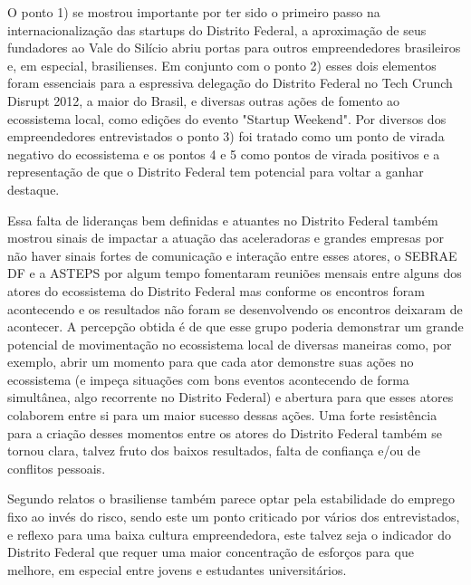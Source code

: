 O ponto 1) se mostrou importante por ter sido o primeiro passo na internacionalização das startups do Distrito Federal, a aproximação de seus fundadores ao Vale do Silício abriu portas para outros empreendedores brasileiros e, em especial, brasilienses. Em conjunto com o ponto 2) esses dois elementos foram essenciais para a espressiva delegação do Distrito Federal no Tech Crunch Disrupt 2012, a maior do Brasil, e diversas outras ações de fomento ao ecossistema local, como edições do evento "Startup Weekend". Por diversos dos empreendedores entrevistados o ponto 3) foi tratado como um ponto de virada negativo do ecossistema e os pontos 4 e 5 como pontos de virada positivos e a representação de que o Distrito Federal tem potencial para voltar a ganhar destaque. 

Essa falta de lideranças bem definidas e atuantes no Distrito Federal também mostrou sinais de impactar a atuação das aceleradoras e grandes empresas por não haver sinais fortes de comunicação e interação entre esses atores, o SEBRAE DF e a ASTEPS por algum tempo fomentaram reuniões mensais entre alguns dos atores do ecossistema do Distrito Federal mas conforme os encontros foram acontecendo e os resultados não foram se desenvolvendo os encontros deixaram de acontecer. A percepção obtida é de que esse grupo poderia demonstrar um grande potencial de movimentação no ecossistema local de diversas maneiras como, por exemplo, abrir um momento para que cada ator demonstre suas ações no ecossistema (e impeça situações com bons eventos acontecendo de forma simultânea, algo recorrente no Distrito Federal) e abertura para que esses atores colaborem entre si para um maior sucesso dessas ações. Uma forte resistência para a criação desses momentos entre os atores do Distrito Federal também se tornou clara, talvez fruto dos baixos resultados, falta de confiança e/ou de conflitos pessoais.

Segundo relatos o brasiliense também parece optar pela estabilidade do emprego fixo ao invés do risco, sendo este um ponto criticado por vários dos entrevistados, e reflexo para uma baixa cultura empreendedora, este talvez seja o indicador do Distrito Federal que requer uma maior concentração de esforços para que melhore, em especial entre jovens e estudantes universitários. 

